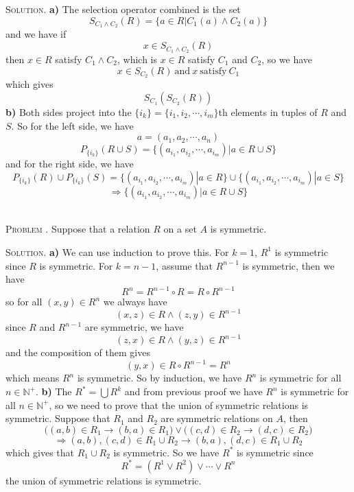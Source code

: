 \documentclass[12pt, a4paper, oneside]{article}
\newcounter{problemname}
\newenvironment{problem}{\stepcounter{problemname}\par\noindent\textsc{Problem \arabic{problemname}. }}{\\\par}
\newenvironment{solution}{\par\noindent\textsc{Solution. }}{\\\par}
\begin{document}
\begin{solution}
    \textbf{a)} The selection operator combined is the set
    \[ S_{C_1\wedge C_2}(R) = \{ a\in R | C_1(a)\wedge C_2(a) \} \]
    and we have if \[ x\in S_{C_1\wedge C_2}(R) \]
    then $x\in R$ satisfy $C_1 \wedge C_2$, which is $x\in R$ satisfy $C_1$ and $C_2$, so we have
    \[ x\in S_{C_2}(R)\ \text{and}\ x\ \text{satisfy}\ C_1\]
    which gives
    \[ S_{C_1}(S_{C_2}(R))\]
    \textbf{b)} Both sides project into the $\{i_k\} = \{ i_1,i_2, \cdots, i_m\}$th elements in tuples of $R$ and $S$.
    So for the left side, we have
    \[ a = (a_1, a_2, \cdots, a_n) \]
    \[ P_{\{i_k\}}(R\cup S) = \{ (a_{i_1}, a_{i_2}, \cdots, a_{i_m}) | a\in R\cup S \}\]
    and for the right side, we have
    \[ P_{\{i_k\}}(R) \cup P_{\{i_k\}}(S) = \{ (a_{i_1}, a_{i_2}, \cdots, a_{i_m}) | a\in R \} \cup \{ (a_{i_1}, a_{i_2}, \cdots, a_{i_m}) | a\in S \}\]
    \[ \Rightarrow \{ (a_{i_1}, a_{i_2}, \cdots, a_{i_m}) | a\in R\cup S \}\]
\end{solution}

\begin{problem}
    Suppose that a relation $R$ on a set $A$ is symmetric.
\end{problem}

\begin{solution}
    \textbf{a)} We can use induction to prove this.
    \newline For $k=1$, $R^1$ is symmetric since $R$ is symmetric.
    \newline For $k=n-1$, assume that $R^{n-1}$ is symmetric, then we have
    \[ R^n = R^{n-1} \circ R = R \circ R^{n-1} \]
    so for all $ (x,y)\in R^n $ we always have
    \[ (x,z) \in R \wedge (z,y) \in R^{n-1} \]
    since $R$ and $R^{n-1}$ are symmetric, we have
    \[ (z,x) \in R \wedge (y,z) \in R^{n-1} \]
    and the composition of them gives
    \[ (y,x) \in R \circ R^{n-1} = R^n \]
    which means $R^n$ is symmetric. So by induction, we have $R^n$ is symmetric for all $n\in \mathbb{N^+}$.
    \newline \textbf{b)} The $R^* = \bigcup R^k$ and from previous proof we have $R^n$ is symmetric for all $n\in \mathbb{N^+}$,
    so we need to prove that the union of symmetric relations is symmetric. Suppose that $R_1$ and $R_2$ are symmetric relations on $A$,
    then
    \[ \Big( (a,b) \in R_1 \rightarrow (b,a) \in R_1 \Big) \vee \Big( (c,d)  \in R_2 \rightarrow (d,c)\in R_2 \Big) \]
    \[ \Rightarrow (a,b),(c,d) \in R_1 \cup R_2 \rightarrow (b,a), (d,c) \in R_1\cup R_2 \]
    which gives that $R_1\cup R_2$ is symmetric. So we have $R^*$ is symmetric since
    \[ R^* = (R^1 \vee R^2) \vee \cdots \vee R^n \]
    the union of symmetric relations is symmetric.
\end{solution}
\end{document}
